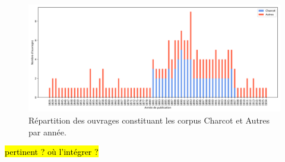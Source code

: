 \begin{figure}[h]
	\centering
	\includegraphics[width=1\textwidth]{img/distribution_ouvrages.png}
	\caption[Positionnement de l'entité \texttt{Jean-Martin Charcot} au sein de son domaine et comparaison avec les entités les plus similaires à lui \textit{via} une analyse de quadrant de l'outil Rankingdom.]{Répartition des ouvrages constituant les corpus Charcot et Autres par année.}
	\label{fig:repartition_corpus}
\end{figure}


\hl{pertinent ? où l'intégrer ?}